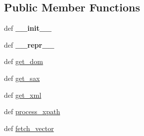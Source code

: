 \subsection*{Public Member Functions}
\begin{DoxyCompactItemize}
\item 
\hypertarget{classcheshire3_1_1base_objects_1_1_record_a5b0d824f15dcf39da6694289957d2f74}{def {\bfseries \-\_\-\-\_\-init\-\_\-\-\_\-}}\label{classcheshire3_1_1base_objects_1_1_record_a5b0d824f15dcf39da6694289957d2f74}

\item 
\hypertarget{classcheshire3_1_1base_objects_1_1_record_a7c24f0ce0805c325294dfd738e75c978}{def {\bfseries \-\_\-\-\_\-repr\-\_\-\-\_\-}}\label{classcheshire3_1_1base_objects_1_1_record_a7c24f0ce0805c325294dfd738e75c978}

\item 
def \hyperlink{classcheshire3_1_1base_objects_1_1_record_acb201f024be272684bd03aa58d2bbb96}{get\-\_\-dom}
\item 
def \hyperlink{classcheshire3_1_1base_objects_1_1_record_a75e9eecae84bcf1d12561c88c1f189de}{get\-\_\-sax}
\item 
def \hyperlink{classcheshire3_1_1base_objects_1_1_record_a5ebc1bdd06e09256b13290e9a9533aae}{get\-\_\-xml}
\item 
def \hyperlink{classcheshire3_1_1base_objects_1_1_record_a0350256e5b530534ee9c3091a2acfa19}{process\-\_\-xpath}
\item 
def \hyperlink{classcheshire3_1_1base_objects_1_1_record_ade4ca64832ddbc061dd8a93b14dd840f}{fetch\-\_\-vector}
\end{DoxyCompactItemize}
